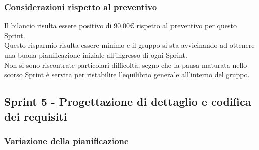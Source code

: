\subsubsection{Considerazioni rispetto al preventivo} \label{subsubsection:considerazioni_finali_sprint4}
Il bilancio risulta essere positivo di 90,00€ rispetto al preventivo per questo Sprint\glo{}.
\\Questo risparmio risulta essere minimo e il gruppo si sta avvicinando ad ottenere una buona pianificazione iniziale all'ingresso di ogni Sprint\glo{}.
\\Non si sono riscontrate particolari difficoltà, segno che la pausa maturata nello scorso Sprint\glo{} è servita per ristabilire l'equilibrio generale all'interno del gruppo.


\subsection{Sprint 5 - Progettazione di dettaglio e codifica dei requisiti} \label{subsection:consuntivo_sprint5}
\subsubsection{Variazione della pianificazione} \label{subsubsection:variazione_pianificazione_sprint5}

